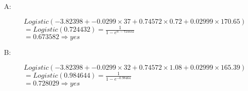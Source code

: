 \documentclass[solution]{ditpaper}
\begin{document}
\begin{enumerate}
\begin{answer}
		\begin{description}
		\item[A:] $Logistic(-3.82398+-0.0299\times37+0.74572\times0.72+0.02999\times170.65)$ \\
		$=Logistic(0.724432)   =\frac{1}{1-e^{0.-724432}}$ \\
		$=0.673582 \Rightarrow \textit{yes}$
		\item[B:] $Logistic(-3.82398+-0.0299\times32+0.74572\times1.08+0.02999\times165.39)$ \\
		$=Logistic(0.984644)   =\frac{1}{1-e^{-0.98464}}$ \\
		$=0.728029 \Rightarrow \textit{yes}$
		\end{description}
		\end{answer}


\end{enumerate}
\end{document}
